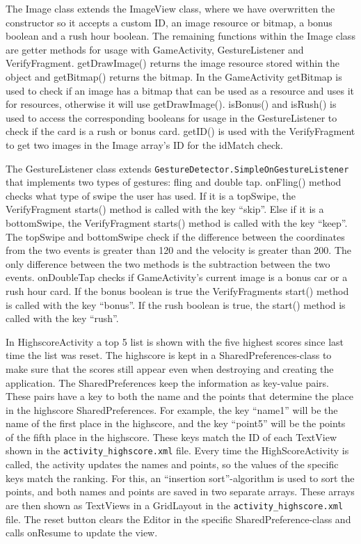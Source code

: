 The Image class extends the ImageView class, where we have overwritten the constructor so it accepts a custom ID, an image resource or bitmap, a bonus boolean and a rush hour boolean. The remaining functions within the Image class are getter methods for usage with GameActivity, GestureListener and VerifyFragment. getDrawImage() returns the image resource stored within the object and getBitmap() returns the bitmap. In the GameActivity getBitmap is used to check if an image has a bitmap that can be used as a resource and uses it for resources, otherwise it will use getDrawImage(). isBonus() and isRush() is used to access the corresponding booleans for usage in the GestureListener to check if the card is a rush or bonus card. getID() is used with the VerifyFragment to get two images in the Image array’s ID for the idMatch check. \newline

\newpage
The GestureListener class extends \verb|GestureDetector.SimpleOnGestureListener| \\ that implements two types of gestures: fling and double tap. onFling() method checks what type of swipe the user has used. If it is a topSwipe, the VerifyFragment starts() method is called with the key “skip”. Else if it is a bottomSwipe, the VerifyFragment starts() method is called with the key “keep”. The topSwipe and bottomSwipe check if the difference between the coordinates from the two events is greater than 120 and the velocity is greater than 200. The only difference between the two methods is the subtraction between the two events. onDoubleTap checks if GameActivity’s current image is a bonus car or a rush hour card. If the bonus boolean is true the VerifyFragments start() method is called with the key “bonus”. If the rush boolean is true, the start() method is called with the key “rush”. \newline

In HighscoreActivity a top 5 list is shown with the five highest scores since last time the list was reset. The highscore is kept in a SharedPreferences-class to make sure that the scores still appear even when destroying and creating the application. The SharedPreferences keep the information as key-value pairs. These pairs have a key to both the name and the points that determine the place in the highscore SharedPreferences. For example, the key “name1” will be the name of the first place in the highscore, and the key “point5” will be the points of the fifth place in the highscore. These keys match the ID of each TextView shown in the \verb|activity_highscore.xml| file. Every time the HighScoreActivity is called, the activity updates the names and points, so the values of the specific keys match the ranking. For this, an “insertion sort”-algorithm is used to sort the points, and both names and points are saved in two separate arrays. These arrays are then shown as TextViews in a GridLayout in the \verb|activity_highscore.xml| file.
The reset button clears the Editor in the specific SharedPreference-class and calls onResume to update the view.   \newline

